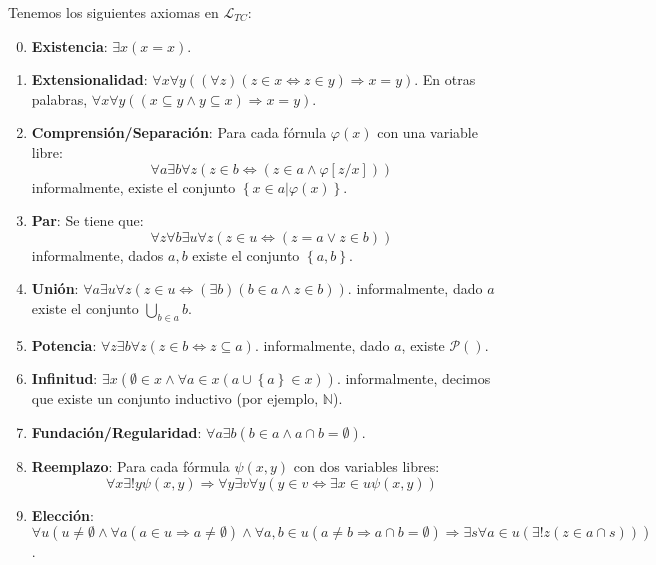 \documentclass[12pt]{report}
\newcounter{it}
\theoremstyle{largebreak}
\newcommand\pot[1]{\ensuremath{\mathcal{P}\left(#1\right)}}
\begin{document}
    \begin{mydef}
        Tenemos los siguientes axiomas en $\mathcal{L}_{TC}$:
        \begin{enumerate}[label = \textit{(\arabic*)}]
            \setcounter{enumi}{-1}
            \item \textbf{Existencia}: $\exists x(x=x)$.
            \item \textbf{Extensionalidad}: $\forall x\forall y((\forall z)(z\in x\iff z\in y)\Rightarrow x=y)$. En otras palabras, $\forall x\forall y((x\subseteq y\land y\subseteq x)\Rightarrow x=y)$.
            \item \textbf{Comprensión/Separación}: Para cada fórnula $\varphi(x)$ con una variable libre:
            \begin{equation*}
                \forall a\exists b\forall z(z\in b\iff (z\in a\land \varphi[z/x]))
            \end{equation*}
            informalmente, existe el conjunto $\left\{x\in a\Big|\varphi(x) \right\}$.
            \item \textbf{Par}: Se tiene que:
            \begin{equation*}
                \forall z\forall b\exists u\forall z(z\in u\iff(z= a\lor z\in b))
            \end{equation*}
            informalmente, dados $a,b$ existe el conjunto $\left\{a,b\right\}$.
            \item \textbf{Unión}: $\forall a\exists u\forall z(z\in u\iff(\exists b)(b\in a\land z\in b))$.
            informalmente, dado $a$ existe el conjunto $\bigcup_{ b\in a}b$.
            \item \textbf{Potencia}: $\forall z\exists b\forall z(z\in b\iff z\subseteq a)$.
            informalmente, dado $a$, existe $\pot{}$.
            \item \textbf{Infinitud}: $\exists x(\emptyset\in x\land \forall a\in x(a\cup\left\{a \right\}\in x))$.
            informalmente, decimos que existe un conjunto inductivo (por ejemplo, $\mathbb{N}$).
            \item \textbf{Fundación/Regularidad}: $\forall a\exists b(b\in a \land a\cap b=\emptyset)$.
            \item \textbf{Reemplazo}: Para cada fórmula $\psi(x,y)$ con dos variables libres:
            \begin{equation*}
                \forall x\exists!y\psi(x,y)\Rightarrow\forall y\exists v\forall y(y\in v\iff \exists x\in u\psi(x,y))
            \end{equation*}
            \item \textbf{Elección}: $\forall u(u\neq\emptyset\land\forall a(a\in u\Rightarrow a\neq\emptyset)\land \forall a,b\in u(a\neq b\Rightarrow a\cap b=\emptyset)\Rightarrow\exists s\forall a\in u(\exists! z(z\in a\cap s)))$.
        \end{enumerate}
    \end{mydef}
\end{document}

